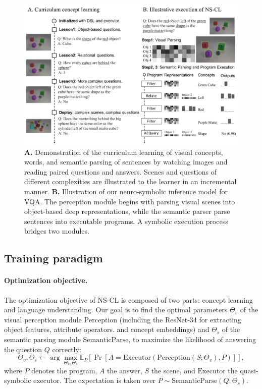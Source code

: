 \documentclass{article} %
\newcommand{\E}{\mathbb{E}}
\newcommand{\model}{NS-CL\xspace}
\begin{document}
%
\begin{figure}[t]
\centering
%
\includegraphics[width=\textwidth]{raw/NSCL.pdf}
\vspace{-15pt}
\caption{{\bf A.} Demonstration of the curriculum learning of visual concepts, words, and semantic parsing of sentences by watching images and reading paired questions and answers. Scenes and questions of different complexities are illustrated to the learner in an incremental manner. {\bf B.} Illustration of our neuro-symbolic inference model for VQA. The perception module begins with parsing visual scenes into object-based deep representations, while the semantic parser parse sentences into executable programs. A symbolic execution process bridges two modules.}
\vspace{-5pt}
\label{fig:nscl}
\end{figure}
 
\subsection{Training paradigm}

\paragraph{Optimization objective.}

The optimization objective of \model is composed of two parts: concept learning and language understanding. Our goal is to find the optimal parameters $\Theta_{v}$ of the visual perception module $\mathrm{Perception}$ (including the ResNet-34 for extracting object features, attribute operators. and concept embeddings) and $\Theta_{s}$ of the semantic parsing module $\mathrm{SemanticParse}$, to maximize the likelihood of answering the question $Q$ correctly:
\begin{equation}
     \Theta_v, \Theta_s \leftarrow \arg \max_{\Theta_v, \Theta_s} \E_{P}[ \Pr[ A= \mathrm{Executor}(\mathrm{Perception}(S; {\Theta_v}), P)] ], \label{eq:reward}
\end{equation}
where $P$ denotes the program, $A$ the answer, $S$ the scene, and $\mathrm{Executor}$ the quasi-symbolic executor. The expectation is taken over $P \sim \mathrm{SemanticParse}(Q; {\Theta_s})$.
\end{document}
